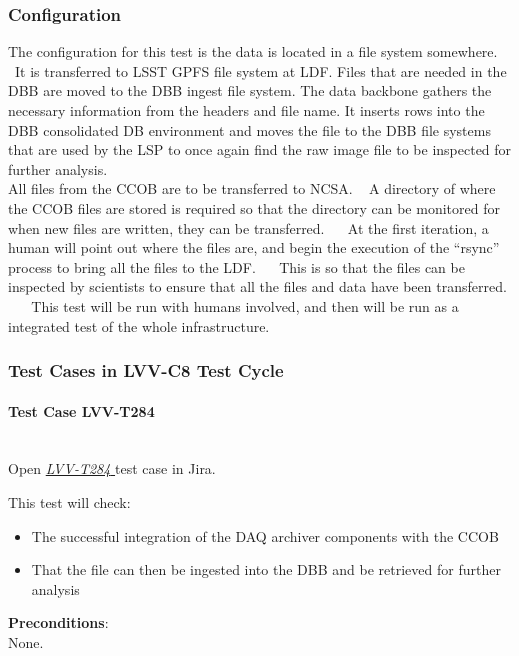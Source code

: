 \documentclass[DM,lsstdraft,STR,toc]{lsstdoc}
\providecommand{\tightlist}{
  \setlength{\itemsep}{0pt}\setlength{\parskip}{0pt}}
\begin{document}
  \subsubsection{Configuration}
    The configuration for this test is the data is located in a file system
somewhere. ~It is transferred to LSST GPFS file system at LDF. Files
that are needed in the DBB are moved to the DBB ingest file system. The
data backbone gathers the necessary information from the headers and
file name. It inserts rows into the DBB consolidated DB environment and
moves the file to the DBB file systems that are used by the LSP to once
again find the raw image file to be inspected for further analysis.
~\\[2\baselineskip]All files from the CCOB are to be transferred to
NCSA. ~ A directory of where the CCOB files are stored is required so
that the directory can be monitored for when new files are written, they
can be transferred. ~ ~At the first iteration, a human will point out
where the files are, and begin the execution of the ``rsync'' process to
bring all the files to the LDF. ~ ~This is so that the files can be
inspected by scientists to ensure that all the files and data have been
transferred. ~ ~ This test will be run with humans involved, and then
will be run as a integrated test of the whole infrastructure. ~


  \subsubsection{Test Cases in LVV-C8 Test Cycle}


    \paragraph{Test Case LVV-T284 }\mbox{}\\

Open  \href{https://jira.lsstcorp.org/secure/Tests.jspa#/testCase/LVV-T284}{\textit{ LVV-T284 } }
test case in Jira.

    This test will check:

\begin{itemize}
\tightlist
\item
  The successful integration of the DAQ archiver components with the
  CCOB
\item
  That the file can then be ingested into the DBB and be retrieved for
  further analysis
\end{itemize}


    {\bf Preconditions}:\\
    None.
\end{document}
